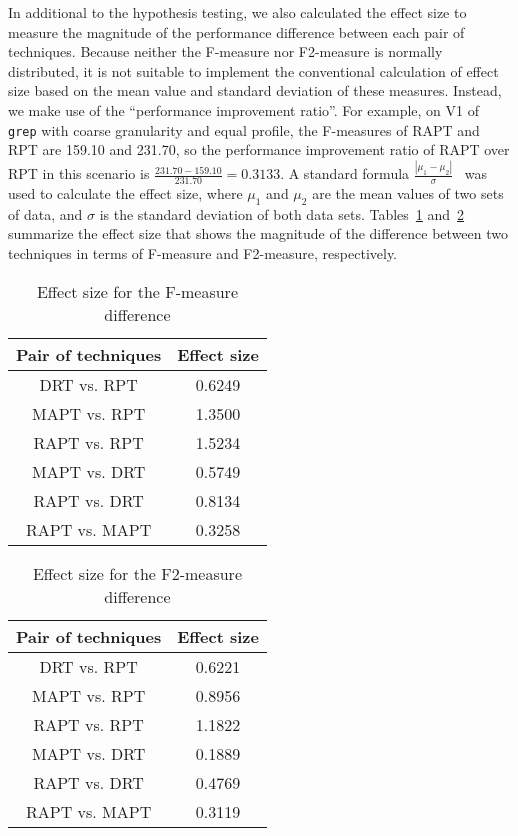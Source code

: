 \documentclass[10pt,journal,compsoc]{IEEEtran}
\begin{document}
In additional to the hypothesis testing, we also calculated the effect size to measure the magnitude of the performance difference between each pair of techniques. Because neither the F-measure nor F2-measure is normally distributed, it is not suitable to implement the conventional calculation of effect size based on the mean value and standard deviation of these measures. Instead, we make use of the ``performance improvement ratio''. For example, on V1 of \texttt{grep} with coarse granularity and equal profile, the F-measures of RAPT and RPT are 159.10 and 231.70, so the performance improvement ratio of RAPT over RPT in this scenario is $\frac{231.70 - 159.10}{231.70} = 0.3133$. A standard formula $\frac{|\mu_1-\mu_2|}{\sigma}$~\cite{Hedges85} was used to calculate the effect size, where $\mu_1$ and $\mu_2$ are the mean values of two sets of data, and $\sigma$ is the standard deviation of both data sets. Tables~\ref{tab:Feffect} and~\ref{tab:F2effect} summarize the effect size that shows the magnitude of the difference between two techniques in terms of F-measure and F2-measure, respectively.

\begin{table}
\caption{Effect size for the F-measure difference}
\label{tab:Feffect}
\centering
\begin{tabular}{|c|c|} \hline
Pair of techniques	& Effect size	\\ \hline
DRT vs. RPT					& 0.6249			\\ \hline
MAPT vs. RPT				& 1.3500			\\ \hline
RAPT vs. RPT				& 1.5234			\\ \hline
MAPT vs. DRT				& 0.5749			\\ \hline
RAPT vs. DRT				& 0.8134			\\ \hline
RAPT vs. MAPT				& 0.3258			\\ \hline
\end{tabular}
\end{table}

\begin{table}
\caption{Effect size for the F2-measure difference}
\label{tab:F2effect}
\centering
\begin{tabular}{|c|c|} \hline
Pair of techniques	& Effect size	\\ \hline
DRT vs. RPT					& 0.6221			\\ \hline
MAPT vs. RPT				& 0.8956			\\ \hline
RAPT vs. RPT				& 1.1822			\\ \hline
MAPT vs. DRT				& 0.1889			\\ \hline
RAPT vs. DRT				& 0.4769			\\ \hline
RAPT vs. MAPT				& 0.3119			\\ \hline
\end{tabular}
\end{table}
\end{document}

